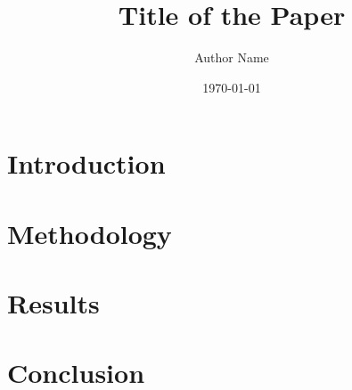 \documentclass{article}
\title{Title of the Paper}
\author{Author Name}
\date{\today}
\begin{document}
\maketitle

\begin{abstract}
\lipsum[1]
\end{abstract}

\tableofcontents

\section{Introduction}
\lipsum[2]

\section{Methodology}
\lipsum[3]

\section{Results}
\lipsum[4]

\section{Conclusion}
\lipsum[5]
\end{document}

